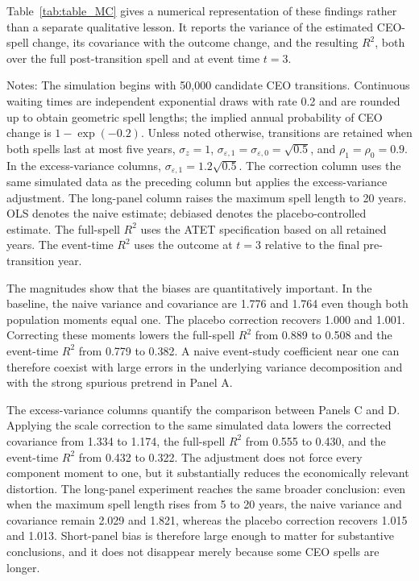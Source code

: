 \documentclass[sigconf,nonacm]{acmart}
\newcommand{\tablepath}{papers/econometrics/table}
\begin{document}
Table~\ref{tab:table_MC} gives a numerical representation of these findings rather than a separate qualitative lesson. It reports the variance of the estimated CEO-spell change, its covariance with the outcome change, and the resulting \(R^2\), both over the full post-transition spell and at event time \(t=3\).
\begin{table}[t]
    \centering
    \caption{Monte Carlo Estimates by Scenario}
    \vspace{.2cm}
    \label{tab:table_MC}
    
    \begin{minipage}{\textwidth}
    \vspace{.2cm}
    \footnotesize{Notes: The simulation begins with 50,000 candidate CEO transitions. Continuous waiting times are independent exponential draws with rate 0.2 and are rounded up to obtain geometric spell lengths; the implied annual probability of CEO change is \(1-\exp(-0.2)\). Unless noted otherwise, transitions are retained when both spells last at most five years, \(\sigma_z=1\), \(\sigma_{\varepsilon,1}=\sigma_{\varepsilon,0}=\sqrt{0.5}\), and \(\rho_1=\rho_0=0.9\). In the excess-variance columns, \(\sigma_{\varepsilon,1}=1.2\sqrt{0.5}\). The correction column uses the same simulated data as the preceding column but applies the excess-variance adjustment. The long-panel column raises the maximum spell length to 20 years. OLS denotes the naive estimate; debiased denotes the placebo-controlled estimate. The full-spell \(R^2\) uses the ATET specification based on all retained years. The event-time \(R^2\) uses the outcome at \(t=3\) relative to the final pre-transition year.}
    \end{minipage}
\end{table}

The magnitudes show that the biases are quantitatively important. In the baseline, the naive variance and covariance are 1.776 and 1.764 even though both population moments equal one. The placebo correction recovers 1.000 and 1.001. Correcting these moments lowers the full-spell \(R^2\) from 0.889 to 0.508 and the event-time \(R^2\) from 0.779 to 0.382. A naive event-study coefficient near one can therefore coexist with large errors in the underlying variance decomposition and with the strong spurious pretrend in Panel A.

The excess-variance columns quantify the comparison between Panels C and D. Applying the scale correction to the same simulated data lowers the corrected covariance from 1.334 to 1.174, the full-spell \(R^2\) from 0.555 to 0.430, and the event-time \(R^2\) from 0.432 to 0.322. The adjustment does not force every component moment to one, but it substantially reduces the economically relevant distortion. The long-panel experiment reaches the same broader conclusion: even when the maximum spell length rises from 5 to 20 years, the naive variance and covariance remain 2.029 and 1.821, whereas the placebo correction recovers 1.015 and 1.013. Short-panel bias is therefore large enough to matter for substantive conclusions, and it does not disappear merely because some CEO spells are longer.
\end{document}
